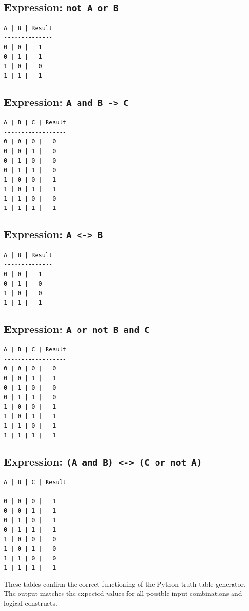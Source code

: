 \documentclass[a4paper, journal]{IEEEtran}
\begin{document}
\subsection*{Expression: \texttt{not A or B}}
\begin{verbatim}
A | B | Result
--------------
0 | 0 |   1
0 | 1 |   1
1 | 0 |   0
1 | 1 |   1
\end{verbatim}

\subsection*{Expression: \texttt{A and B -> C}}
\begin{verbatim}
A | B | C | Result
------------------
0 | 0 | 0 |   0
0 | 0 | 1 |   0
0 | 1 | 0 |   0
0 | 1 | 1 |   0
1 | 0 | 0 |   1
1 | 0 | 1 |   1
1 | 1 | 0 |   0
1 | 1 | 1 |   1
\end{verbatim}

\subsection*{Expression: \texttt{A <-> B}}
\begin{verbatim}
A | B | Result
--------------
0 | 0 |   1
0 | 1 |   0
1 | 0 |   0
1 | 1 |   1
\end{verbatim}

\subsection*{Expression: \texttt{A or not B and C}}
\begin{verbatim}
A | B | C | Result
------------------
0 | 0 | 0 |   0
0 | 0 | 1 |   1
0 | 1 | 0 |   0
0 | 1 | 1 |   0
1 | 0 | 0 |   1
1 | 0 | 1 |   1
1 | 1 | 0 |   1
1 | 1 | 1 |   1
\end{verbatim}

\subsection*{Expression: \texttt{(A and B) <-> (C or not A)}}
\begin{verbatim}
A | B | C | Result
------------------
0 | 0 | 0 |   1
0 | 0 | 1 |   1
0 | 1 | 0 |   1
0 | 1 | 1 |   1
1 | 0 | 0 |   0
1 | 0 | 1 |   0
1 | 1 | 0 |   0
1 | 1 | 1 |   1
\end{verbatim}

These tables confirm the correct functioning of the Python truth table generator. The output matches the expected values for all possible input combinations and logical constructs.
\end{document}
